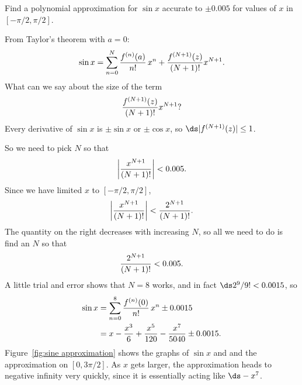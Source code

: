 \begin{example}{}{}
Find a polynomial approximation for $\sin x$ accurate to $\pm 0.005$ for values of $x$ in $[-\pi/2,\pi/2]$. 
\end{example}
\begin{solution}
From Taylor's theorem with $a=0$:
$$
  \sin x= \sum_{n=0}^N{f^{(n)}(a)\over n!}\,x^n + 
  {f^{(N+1)}(z)\over (N+1)!}x^{N+1}.
$$
What can we say about the size of the term
$${f^{(N+1)}(z)\over (N+1)!}x^{N+1}?$$
Every derivative of $\sin x$ is $\pm\sin x$ or $\pm\cos x$, so
$\ds |f^{(N+1)}(z)|\le 1$.

So we need to pick $N$ so that 
$$\left|{x^{N+1}\over (N+1)!}\right|< 0.005.$$
Since we have limited $x$ to $[-\pi/2,\pi/2]$,
$$\left|{x^{N+1}\over (N+1)!}\right|<{2^{N+1}\over (N+1)!}.$$
The quantity on the right decreases with increasing $N$, so all we
need to do is find an $N$ so that 
$${2^{N+1}\over (N+1)!}<0.005.$$
A little trial and error shows that $N=8$ works, 
and in fact $\ds 2^{9}/9!<0.0015$, so 
\begin{align*}
  \sin x &=\sum_{n=0}^8{f^{(n)}(0)\over n!}\,x^n \pm 0.0015	\\
  &=x-{x^3\over 6}+{x^5\over 120}-{x^7\over 5040}\pm 0.0015.
\end{align*}
Figure~\ref{fig:sine approximation} shows the graphs of $\sin x$ and
and the approximation on $[0,3\pi/2]$. As $x$ gets larger, the
approximation heads to negative infinity very quickly, since it is
essentially acting like $\ds -x^7$.
\end{solution}

